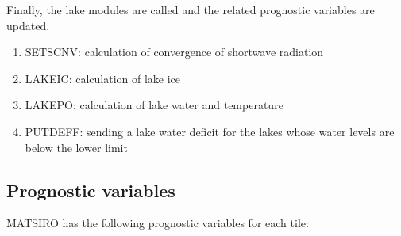 Finally, the lake modules are called and the related prognostic variables are updated.

\begin{enumerate}
\def\labelenumi{(\alph{enumi})}
\setcounter{enumi}{15}
\tightlist
\item
  SETSCNV: calculation of convergence of shortwave radiation
\item
  LAKEIC: calculation of lake ice
\item
  LAKEPO: calculation of lake water and temperature
\item
  PUTDEFF: sending a lake water deficit for the lakes whose water levels are below the lower limit
\end{enumerate}

\hypertarget{prognostic-variables}{%
\subsection{Prognostic variables}\label{prognostic-variables}}

MATSIRO has the following prognostic variables for each tile:

